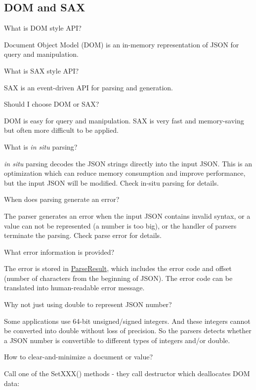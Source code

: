 \subsection*{D\+OM and S\+AX}


\begin{DoxyEnumerate}
\item What is D\+OM style A\+PI?

Document Object Model (D\+OM) is an in-\/memory representation of J\+S\+ON for query and manipulation.
\item What is S\+AX style A\+PI?

S\+AX is an event-\/driven A\+PI for parsing and generation.
\item Should I choose D\+OM or S\+AX?

D\+OM is easy for query and manipulation. S\+AX is very fast and memory-\/saving but often more difficult to be applied.
\item What is {\itshape in situ} parsing?

{\itshape in situ} parsing decodes the J\+S\+ON strings directly into the input J\+S\+ON. This is an optimization which can reduce memory consumption and improve performance, but the input J\+S\+ON will be modified. Check in-\/situ parsing for details.
\item When does parsing generate an error?

The parser generates an error when the input J\+S\+ON contains invalid syntax, or a value can not be represented (a number is too big), or the handler of parsers terminate the parsing. Check parse error for details.
\item What error information is provided?

The error is stored in {\ttfamily \hyperlink{struct_parse_result}{Parse\+Result}}, which includes the error code and offset (number of characters from the beginning of J\+S\+ON). The error code can be translated into human-\/readable error message.
\item Why not just using {\ttfamily double} to represent J\+S\+ON number?

Some applications use 64-\/bit unsigned/signed integers. And these integers cannot be converted into {\ttfamily double} without loss of precision. So the parsers detects whether a J\+S\+ON number is convertible to different types of integers and/or {\ttfamily double}.
\item How to clear-\/and-\/minimize a document or value?

Call one of the {\ttfamily Set\+X\+X\+X()} methods -\/ they call destructor which deallocates D\+OM data\+:
\end{DoxyEnumerate}


